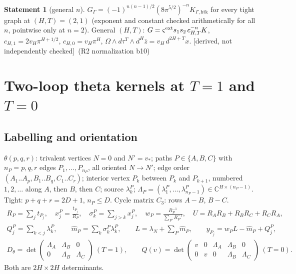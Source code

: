 \documentclass[10pt,a4paper]{article}
\numberwithin{equation}{section}
\theoremstyle{definition}
\newtheorem{dstatement}[theorem]{Statement}
\theoremstyle{remark}
\newcommand{\zb}{\bar z}
\newcommand{\der}{\textup{[derived, not independently checked]}}
\newcommand{\htk}{\mathrm{htk}}
\begin{document}
\begin{dstatement}[general $n$]
$G_\Gamma=(-1)^{n(n-1)/2}(8\pi^{5/2})^{-n}K_{\Gamma,\htk}$ for every tight graph at $(H,T)=(2,1)$ (exponent and constant checked arithmetically for all $n$, pointwise only at $n=2$). General $(H,T)$: $G=\varsigma^{\rm ext}s_1s_2\,c_{H,T}^{-n}K$, $c_{H,1}=2v_H\pi^{H+1/2}$, $c_{H,0}=v_H\pi^H$, $\Omega\wedge d\tau^T\wedge d^H\zb=v_H\,d^{2H+T}x$. \der\ (R2 normalization b10)
\end{dstatement}

\section{\texorpdfstring{Two-loop theta kernels at $T=1$ and $T=0$}{Two-loop theta kernels at T=1 and T=0}}\label{sec-theta}

\subsection{Labelling and orientation}\label{sec-theta-lab}
$\theta(p,q,r)$: trivalent vertices $N=0$ and $N'=v_*$; paths $P\in\{A,B,C\}$ with $n_P=p,q,r$ edges $P_1,\dots,P_{n_P}$, all oriented $N\to N'$; edge order $(A_1..A_p,B_1..B_q,C_1..C_r)$; interior vertex $P_k$ between $P_k$ and $P_{k+1}$, numbered $1,2,\dots$ along $A$, then $B$, then $C$; source $\lambda^P_k$; $\Lambda_P=(\lambda^P_1,\dots,\lambda^P_{n_P-1})\in\mathbb C^{H\times(n_P-1)}$. Tight: $p+q+r=2D+1$, $n_P\le D$. Cycle matrix $C_3$: rows $A-B$, $B-C$.
\begin{gather}
R_P=\sum_jt_{P_j},\quad x^P_j=\frac{t_{P_j}}{R_P},\quad \sigma^P_k=\sum_{j>k}x^P_j,\quad w_P=\frac{R_P^{-1}}{\sum_{P'}R_{P'}^{-1}},\quad U=R_AR_B+R_BR_C+R_CR_A,\\
Q^P_j=\sum_{k<j}\lambda^P_k,\qquad \hat m_P=\sum_k\sigma^P_k\lambda^P_k,\qquad L=\lambda_N+\sum_P\hat m_P,\qquad y_{P_j}=w_PL-\hat m_P+Q^P_j,\\
D_\theta=\det\begin{pmatrix}\Lambda_A&\Lambda_B&0\\0&\Lambda_B&\Lambda_C\end{pmatrix}\ (T=1),\qquad
Q(v)=\det\begin{pmatrix}v&0&\Lambda_A&\Lambda_B&0\\0&v&0&\Lambda_B&\Lambda_C\end{pmatrix}\ (T=0).
\end{gather}
Both are $2H\times2H$ determinants.
\end{document}
